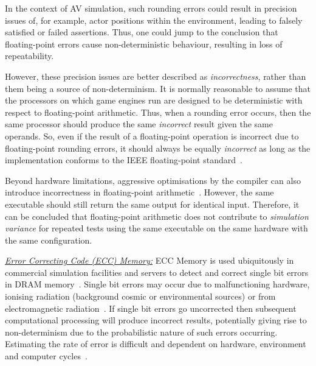 \documentclass[letterpaper, 10 pt, journal, twoside]{IEEEtran}
\begin{document}
In the context of AV simulation, such rounding errors could result in precision issues of, for example, actor positions within the environment, leading to falsely satisfied or failed assertions.
%
Thus, one could jump to the conclusion that floating-point errors cause non-deterministic behaviour, resulting in loss of repeatability. 

However, these precision issues are better described as \textit{incorrectness}, rather than them being a source of non-determinism. 
%
It is normally reasonable to assume that the processors on which game engines run are designed to be deterministic with respect to floating-point arithmetic. 
%
Thus, when a rounding error occurs, then the same processor should produce the same \textit{incorrect} result given the same operands. 
%
So, even if the result of a floating-point operation is incorrect due to floating-point rounding errors, it should always 
be equally \textit{incorrect} as long as the implementation conforms to the IEEE floating-point standard~\cite{8766229}.

Beyond hardware limitations, aggressive optimisations by the compiler can also introduce incorrectness in floating-point arithmetic~\cite{llvm-floating-point}. However, the same executable should still return the same output for identical input. 
%
Therefore, it can be concluded that floating-point arithmetic does not contribute to \textit{simulation variance} for repeated tests using the same executable on the same hardware with the same configuration.


\noindent\underline{\textit{Error Correcting Code (ECC) Memory:}}
ECC Memory is used ubiquitously in commercial simulation facilities and servers to detect and correct single bit errors in DRAM memory~\cite{Dell1997}. Single bit errors may occur due to malfunctioning hardware, ionising radiation (background cosmic or environmental sources) or from electromagnetic radiation~\cite{dodd2003basic}. If single bit errors go uncorrected then subsequent computational processing will produce incorrect results, potentially giving rise to non-determinism due to the probabilistic nature of such errors occurring. Estimating the rate of error is difficult and dependent on hardware, environment and computer cycles~\cite{mielke2008bit}.
\end{document}
